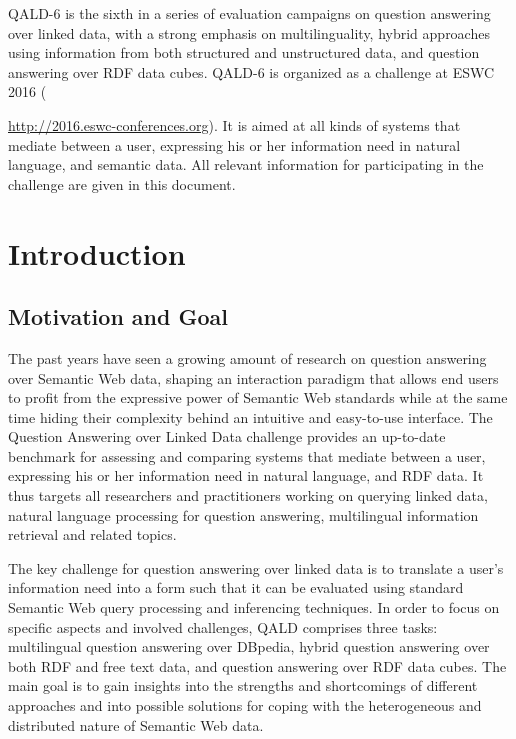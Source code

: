 \documentclass[a4paper]{article}
\begin{document}
QALD-6 is the sixth in a series of evaluation campaigns on question answering over linked data,
with a strong emphasis on multilinguality, hybrid approaches using information from both structured and unstructured data, and question answering over RDF data cubes.
QALD-6 is organized as a challenge at ESWC 2016 ({\url{http://2016.eswc-conferences.org}).
It is aimed at all kinds of systems that mediate between a user, expressing his or her information need in natural language, and semantic data.
All relevant information for participating in the challenge are given in this document.

\vspace{-1.4cm}

\tableofcontents

\newpage

\section{Introduction}

\subsection*{Motivation and Goal}

The past years have seen a growing amount of research on question answering over Semantic Web data, shaping an interaction paradigm that allows end users to profit from the expressive power of Semantic Web standards while at the same time hiding their complexity behind an intuitive and easy-to-use interface. The Question Answering over Linked Data challenge provides an up-to-date benchmark for assessing and comparing systems that mediate between a user, expressing his or her information need in natural language, and RDF data. It thus targets all researchers and practitioners working on querying linked data, natural language processing for question answering, multilingual information retrieval and related topics.

The key challenge for question answering over linked data is to translate a user's information need into a form such that it can be evaluated using standard Semantic Web query processing and inferencing techniques. In order to focus on specific aspects and involved challenges, QALD comprises three tasks: multilingual question answering over DBpedia, hybrid question answering over both RDF and free text data, and question answering over RDF data cubes.
The main goal is to gain insights into the strengths and shortcomings of different approaches and into possible solutions for coping with the heterogeneous and distributed nature of Semantic Web data.

}
\end{document}
